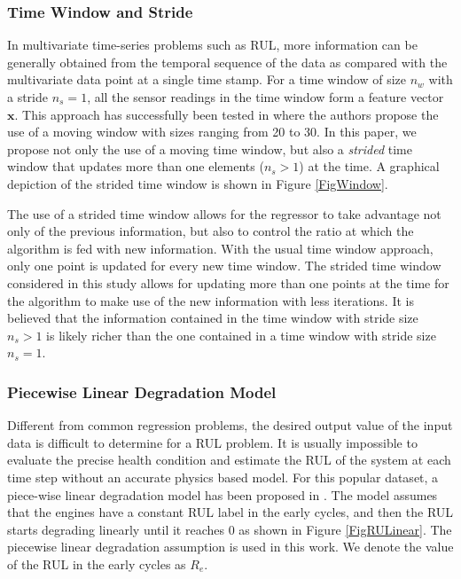 \documentclass[12pt]{IEEEtran}%
\begin{document}
\subsubsection{Time Window and Stride}

In multivariate time-series problems such as RUL, more information can be
generally obtained from the temporal sequence of the data as compared with the
multivariate data point at a single time stamp. For a time window of size
$n_{w}$ with a stride $n_{s}=1$, all the sensor readings in the time window
form a feature vector $\mathbf{x}$. This approach has successfully been tested
in \cite{Li2018,Lim2016} where the authors propose the use of a moving window
with sizes ranging from 20 to 30. In this paper, we propose not only the use of
a moving time window, but also a \textit{strided} time window that updates
more than one elements ($n_{s}>1$) at the time. A graphical depiction of the
strided time window is shown in Figure \ref{FigWindow}.

The use of a strided time window allows for the regressor to take advantage
not only of the previous information, but also to control the ratio at which
the algorithm is fed with new information. With the usual time window
approach, only one point is updated for every new time window. The strided
time window considered in this study allows for updating more than one points
at the time for the algorithm to make use of the new information with less iterations. It
is believed that the information contained in the time window with stride size
$n_{s}>1$ is likely richer than the one contained in a time window with stride
size $n_{s}=1$.

\subsubsection{Piecewise Linear Degradation Model}

Different from common regression problems, the desired output value of the
input data is difficult to determine for a RUL problem. It is usually
impossible to evaluate the precise health condition and estimate the RUL of
the system at each time step without an accurate physics based model. For this
popular dataset, a piece-wise linear degradation model has been proposed in
\cite{Ramasso2014}. The model assumes that the engines have a constant RUL
label in the early cycles, and then the RUL starts degrading linearly until it
reaches 0 as shown in Figure \ref{FigRULinear}. The piecewise linear
degradation assumption is used in this work. We denote the value of the RUL in
the early cycles as $R_{e}$.
\end{document}
